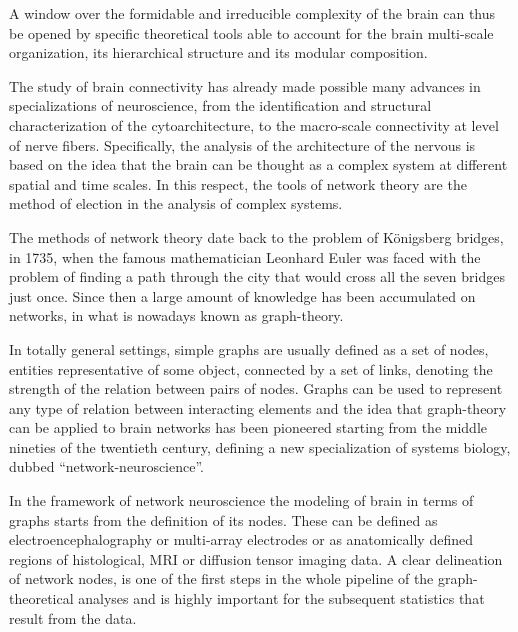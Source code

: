 A window over the formidable and irreducible complexity of the brain can thus be opened by specific theoretical tools able to account for the brain multi-scale organization, its hierarchical structure and its modular composition.

The study of brain connectivity has already made possible many advances in specializations of neuroscience, from the identification and structural characterization of the cytoarchitecture, to the macro-scale connectivity at level of nerve fibers.
Specifically, the analysis of the architecture of the nervous is based on the idea that the brain can be thought as a complex system at different spatial and time scales. In this respect, the tools of network theory are the method of election in the analysis of complex systems.
\bigbreak

The methods of network theory date back to the problem of K{\"o}nigsberg bridges, in 1735, when the famous mathematician Leonhard Euler was faced with the problem of finding a path through the city that would cross all the seven bridges just once.
Since then a large amount of knowledge has been accumulated on networks, in what is nowadays known as graph-theory.

In totally general settings, simple graphs are usually defined as a set of nodes, entities representative of some object, connected by a set of links, denoting the strength of the relation between pairs of nodes.
Graphs can be used to represent any type of relation between interacting elements and the idea that graph-theory can be applied to brain networks has been pioneered starting from the middle nineties of the twentieth century, defining a new specialization of systems biology, dubbed ``network-neuroscience''.

In the framework of network neuroscience the modeling of brain in terms of graphs starts from the definition of its nodes. These can be defined as electroencephalography or multi-array electrodes or as anatomically defined regions of histological, MRI or diffusion tensor imaging data. A clear delineation of network nodes, is one of the first steps in the whole pipeline of the graph-theoretical analyses and is highly important for the subsequent statistics that result from the data.


